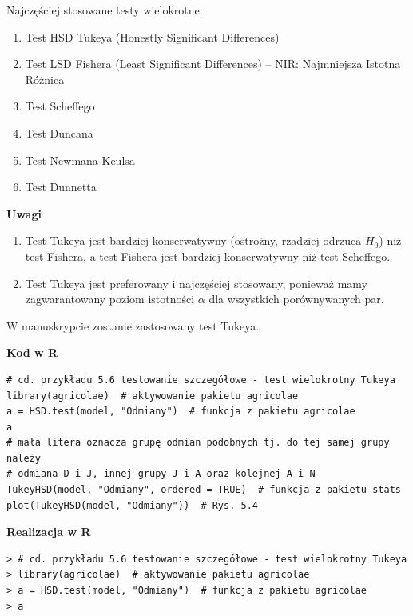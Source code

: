 \documentclass[12pt,B5paper,]{book}
\providecommand{\tightlist}{%
  \setlength{\itemsep}{0pt}\setlength{\parskip}{0pt}}
\begin{document}
Najczęściej stosowane testy wielokrotne:

\begin{enumerate}
\def\labelenumi{\arabic{enumi}.}
\tightlist
\item
  Test HSD Tukeya (Honestly Significant Differences)
\item
  Test LSD Fishera (Least Significant Differences) -- NIR: Najmniejsza
  Istotna Różnica
\item
  Test Scheffego
\item
  Test Duncana
\item
  Test Newmana-Keulsa
\item
  Test Dunnetta
\end{enumerate}

\vspace{0.8cm} \textbf{Uwagi}

\begin{enumerate}
\def\labelenumi{\arabic{enumi}.}
\item
  Test Tukeya jest bardziej konserwatywny (ostrożny, rzadziej odrzuca
  \(H_0\)) niż test Fishera, a test Fishera jest bardziej konserwatywny
  niż test Scheffego.
\item
  Test Tukeya jest preferowany i najczęściej stosowany, ponieważ mamy
  zagwarantowany poziom istotności \(\alpha\) dla wszystkich
  porównywanych par.
\end{enumerate}

W manuskrypcie zostanie zastosowany test Tukeya.

\vspace{0.8cm}

\textbf{Kod w R}

\begin{verbatim}
# cd. przykładu 5.6 testowanie szczegółowe - test wielokrotny Tukeya
library(agricolae)  # aktywowanie pakietu agricolae
a = HSD.test(model, "Odmiany")  # funkcja z pakietu agricolae
a
# mała litera oznacza grupę odmian podobnych tj. do tej samej grupy należy
# odmiana D i J, innej grupy J i A oraz kolejnej A i N
TukeyHSD(model, "Odmiany", ordered = TRUE)  # funkcja z pakietu stats
plot(TukeyHSD(model, "Odmiany"))  # Rys. 5.4
\end{verbatim}

\vspace{0.8cm} \textbf{Realizacja w R}

\begin{verbatim}
> # cd. przykładu 5.6 testowanie szczegółowe - test wielokrotny Tukeya
> library(agricolae)  # aktywowanie pakietu agricolae
> a = HSD.test(model, "Odmiany")  # funkcja z pakietu agricolae
> a
\end{verbatim}
\end{document}
